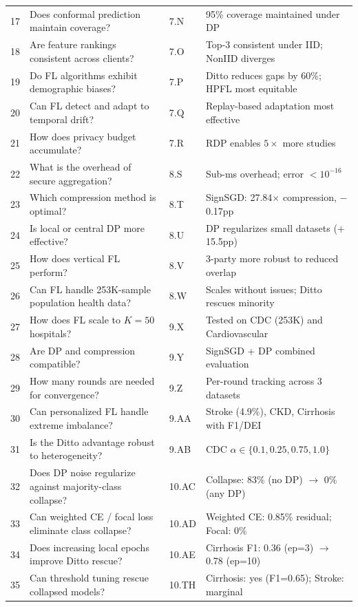 \documentclass[conference,a4paper]{IEEEtran}
\begin{document}
\begin{table}[htbp]
{\begin{tabular}{clll}
17 & Does conformal prediction maintain coverage? & 7.N & 95\% coverage maintained under DP \\
18 & Are feature rankings consistent across clients? & 7.O & Top-3 consistent under IID; NonIID diverges \\
19 & Do FL algorithms exhibit demographic biases? & 7.P & Ditto reduces gaps by 60\%; HPFL most equitable \\
20 & Can FL detect and adapt to temporal drift? & 7.Q & Replay-based adaptation most effective \\
21 & How does privacy budget accumulate? & 7.R & RDP enables $5\times$ more studies \\
22 & What is the overhead of secure aggregation? & 8.S & Sub-ms overhead; error $<10^{-16}$ \\
23 & Which compression method is optimal? & 8.T & SignSGD: 27.84$\times$ compression, $-$0.17pp \\
24 & Is local or central DP more effective? & 8.U & DP regularizes small datasets ($+$15.5pp) \\
25 & How does vertical FL perform? & 8.V & 3-party more robust to reduced overlap \\
26 & Can FL handle 253K-sample population health data? & 8.W & Scales without issues; Ditto rescues minority \\
27 & How does FL scale to $K{=}50$ hospitals? & 9.X & Tested on CDC (253K) and Cardiovascular \\
28 & Are DP and compression compatible? & 9.Y & SignSGD + DP combined evaluation \\
29 & How many rounds are needed for convergence? & 9.Z & Per-round tracking across 3 datasets \\
30 & Can personalized FL handle extreme imbalance? & 9.AA & Stroke (4.9\%), CKD, Cirrhosis with F1/DEI \\
31 & Is the Ditto advantage robust to heterogeneity? & 9.AB & CDC $\alpha{\in}\{0.1, 0.25, 0.75, 1.0\}$ \\
\midrule
32 & Does DP noise regularize against majority-class collapse? & 10.AC & Collapse: 83\% (no DP) $\to$ 0\% (any DP) \\
33 & Can weighted CE / focal loss eliminate class collapse? & 10.AD & Weighted CE: 0.85\% residual; Focal: 0\% \\
34 & Does increasing local epochs improve Ditto rescue? & 10.AE & Cirrhosis F1: 0.36 (ep=3) $\to$ 0.78 (ep=10) \\
35 & Can threshold tuning rescue collapsed models? & 10.TH & Cirrhosis: yes (F1=0.65); Stroke: marginal \\

\end{tabular}}
\end{table}
\end{document}
